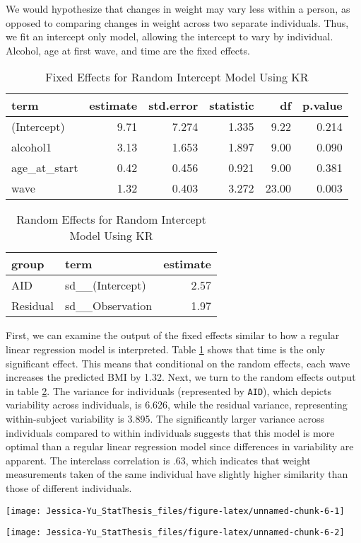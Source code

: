 \documentclass[12pt, twoside]{amherstthesis}
\begin{document}
We would hypothesize that changes in weight may vary less within a person, as opposed to comparing changes in weight across two separate individuals. Thus, we fit an intercept only model, allowing the intercept to vary by individual. Alcohol, age at first wave, and time are the fixed effects.
\begin{table}

\caption{\label{tab:interceptKR}Fixed Effects for Random Intercept Model Using KR}
\centering
\begin{tabular}[t]{l|r|r|r|r|r}
\hline
term & estimate & std.error & statistic & df & p.value\\
\hline
(Intercept) & 9.71 & 7.274 & 1.335 & 9.22 & 0.214\\
\hline
alcohol1 & 3.13 & 1.653 & 1.897 & 9.00 & 0.090\\
\hline
age\_at\_start & 0.42 & 0.456 & 0.921 & 9.00 & 0.381\\
\hline
wave & 1.32 & 0.403 & 3.272 & 23.00 & 0.003\\
\hline
\end{tabular}
\end{table}
\begin{table}

\caption{\label{tab:interceptr}Random Effects for Random Intercept Model Using KR}
\centering
\begin{tabular}[t]{l|l|r}
\hline
group & term & estimate\\
\hline
AID & sd\_\_(Intercept) & 2.57\\
\hline
Residual & sd\_\_Observation & 1.97\\
\hline
\end{tabular}
\end{table}
First, we can examine the output of the fixed effects similar to how a regular linear regression model is interpreted. Table \ref{tab:interceptKR} shows that time is the only significant effect. This means that conditional on the random effects, each wave increases the predicted BMI by 1.32. Next, we turn to the random effects output in table \ref{tab:interceptr}. The variance for individuals (represented by \texttt{AID}), which depicts variability across individuals, is 6.626, while the residual variance, representing within-subject variability is 3.895. The significantly larger variance across individuals compared to within individuals suggests that this model is more optimal than a regular linear regression model since differences in variability are apparent. The interclass correlation is .63, which indicates that weight measurements taken of the same individual have slightly higher similarity than those of different individuals.
\begin{center}\texttt{[image: Jessica-Yu\_StatThesis\_files/figure-latex/unnamed-chunk-6-1]} \end{center}
\begin{center}\texttt{[image: Jessica-Yu\_StatThesis\_files/figure-latex/unnamed-chunk-6-2]} \end{center}
\end{document}
